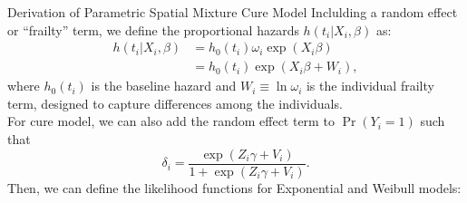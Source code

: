 \documentclass[a4paper, 12pt]{article}
\makeatletter
\renewcommand{\section}{\@startsection
	{section}    {1}    {0mm}    {-0.7\baselineskip}    {0.08\baselineskip}    {\normalfont\large\sc\center\bf}}
\makeatother
\begin{document}
\section{Derivation of Parametric Spatial Mixture Cure Model}
\noindent Inclulding a random effect or ``frailty'' term, we define the proportional hazards $h(t_i |{X}_i,{\beta})$ as:
\begin{equation}
\begin{aligned}
h(t_i |{X}_i, \beta) &= h_0(t_i)\omega_i\exp(X_i \beta)\\
& = h_0(t_i)\exp(X_i \beta+W_i),
\end{aligned}
\end{equation}
where $h_0(t_i)$ is the baseline hazard and $W_i \equiv \ln \omega_i$ is the individual frailty term, designed to capture differences among the individuals.
\\ \newline
\noindent For cure model, we can also add the random effect term to $\Pr(Y_i=1)$ such that  
\begin{equation}
\delta_i =\frac{\exp ({Z}_i{\gamma} + V_i)}{1+\exp ({Z}_i{\gamma}+V_i)}.
\end{equation}
Then, we can define the likelihood functions for Exponential and Weibull models:
\end{document}
